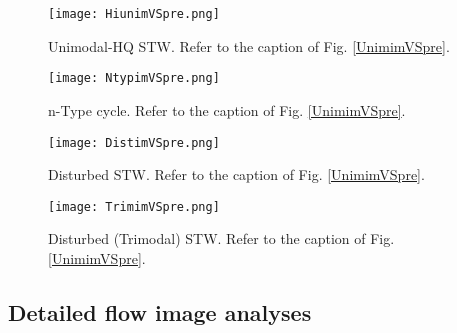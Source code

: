 \documentclass[aps,pre,preprint,groupedaddress,showkeys]{revtex4-2}
\begin{document}
\begin{figure}
\texttt{[image: HiunimVSpre.png]} 
\caption{\label{HiunimVSpre}Unimodal-HQ STW. Refer to the caption of Fig. \ref{UnimimVSpre}.}
\end{figure} 

\begin{figure}
\texttt{[image: NtypimVSpre.png]} 
\caption{\label{NtypimVSpre}n-Type cycle. Refer to the caption of Fig. \ref{UnimimVSpre}.}
\end{figure} 

\begin{figure}
\texttt{[image: DistimVSpre.png]} 
\caption{\label{DistimVSpre}Disturbed STW. Refer to the caption of Fig. \ref{UnimimVSpre}.}
\end{figure}

\begin{figure}
\texttt{[image: TrimimVSpre.png]} 
\caption{\label{TrimimVSpre}Disturbed (Trimodal) STW. Refer to the caption of Fig. \ref{UnimimVSpre}.}
\end{figure} 

\subsection{Detailed flow image analyses}
\end{document}
